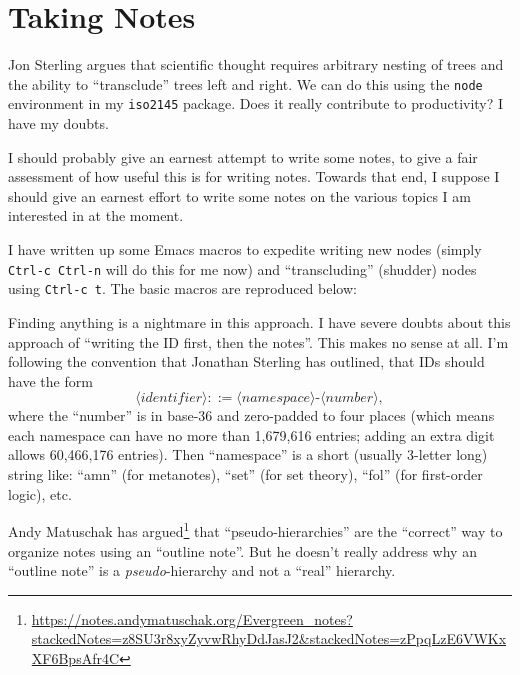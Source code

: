 \chapter{Taking Notes}
\begin{node}\label{amn-0000}%
Jon Sterling argues that scientific thought requires arbitrary nesting
of trees and the ability to ``transclude'' trees left and right. We can
do this using the \verb|node| environment in my \verb|iso2145|
package. Does it really contribute to productivity? I have my doubts.
\end{node}

\begin{node}\label{amn-0001}%
I should probably give an earnest attempt to write some notes, to give a
fair assessment of how useful this is for writing notes. Towards that
end, I suppose I should give an earnest effort to write some notes on
the various topics I am interested in at the moment.
\end{node}

\begin{node}\label{amn-0002}%
I have written up some Emacs macros to expedite writing new nodes
(simply \verb|Ctrl-c Ctrl-n| will do this for me now) and
``transcluding'' (shudder) nodes using \verb|Ctrl-c t|. The basic macros
are reproduced below:

\end{node}

\begin{node}\label{amn-0003}%
Finding anything is a nightmare in this approach. I have severe doubts
about this approach of ``writing the ID first, then the notes''. This
makes no sense at all. I'm following the convention that Jonathan
Sterling has outlined, that IDs should have the form
\begin{equation}
\langle\textit{identifier}\rangle ::= \langle\textit{namespace}\rangle\mbox{-}\langle\textit{number}\rangle,
\end{equation}
where the ``number'' is in base-36 and zero-padded to four places (which
means each namespace can have no more than 1,679,616 entries; adding an
extra digit allows 60,466,176 entries). Then ``namespace'' is a short
(usually 3-letter long) string like: ``amn'' (for metanotes), ``set''
(for set theory), ``fol'' (for first-order logic), etc.
\end{node}

\begin{node}\label{amn-0004}%
Andy Matuschak has argued\footnote{\url{https://notes.andymatuschak.org/Evergreen_notes?stackedNotes=z8SU3r8xyZyvwRhyDdJasJ2&stackedNotes=zPpqLzE6VWKxXF6BpsAfr4C}}
that ``pseudo-hierarchies'' are the ``correct'' way to organize
notes using an ``outline note''. But he doesn't really address why an
``outline note'' is a \emph{pseudo}-hierarchy and not a ``real''
hierarchy. 
\end{node}

